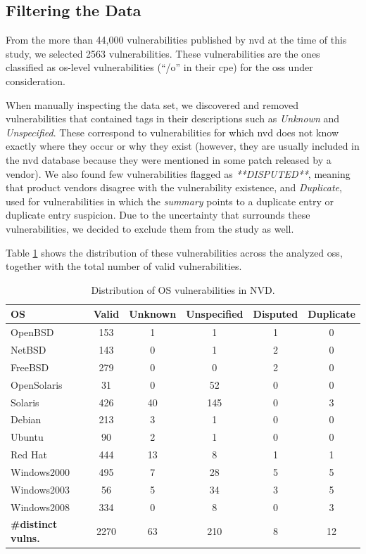 \subsection*{Filtering the Data}\label{filtering_data}


From the more than 44,000 vulnerabilities published by \gls{nvd} at the time of this study, we selected 2563 vulnerabilities.
These vulnerabilities are the ones classified as \gls{os}-level vulnerabilities (``/o'' in their \gls{cpe}) for the \glspl{os} under consideration.

When manually inspecting the data set, we discovered and removed vulnerabilities that contained tags in their descriptions such as \emph{Unknown} and \emph{Unspecified}. 
These correspond to vulnerabilities for which \gls{nvd} does not know exactly where they occur or why they exist (however, they are usually included in the \gls{nvd} database because they were mentioned in some patch released by a vendor). 
We also found few vulnerabilities flagged as \emph{**DISPUTED**}, meaning that product vendors disagree with the vulnerability existence, and \emph{Duplicate}, used for vulnerabilities in which the \emph{summary} points to a duplicate entry or duplicate entry suspicion.
Due to the uncertainty that surrounds these vulnerabilities, we decided to exclude them from the study as well.

Table \ref{tab:unknowns} shows the distribution of these vulnerabilities across the analyzed \glspl{os}, together with the total number of valid vulnerabilities.

\begin{table}[!ht]
\begin{center}
{\scriptsize
\begin{tabular}{|l||c | c | c | c | c|}\hline
\textbf{OS} & \textbf{Valid} & \textbf{Unknown} & \textbf{Unspecified} & \textbf{Disputed} & \textbf{Duplicate}  \\\hline\hline %
OpenBSD & 153 & 1 & 1 & 1 & 0 \\
NetBSD & 143 & 0 & 1 & 2 & 0  \\
FreeBSD & 279 & 0 & 0 & 2 & 0 \\
OpenSolaris & 31 & 0 & 52 & 0 & 0  \\
Solaris & 426 & 40 & 145 & 0 & 3  \\
Debian & 213 & 3 & 1 & 0 & 0  \\
Ubuntu & 90 & 2 & 1 & 0 & 0  \\
Red Hat & 444 & 13 & 8 & 1 & 1  \\
Windows2000 & 495 & 7 & 28 & 5 & 5  \\
Windows2003 & 56 & 5 & 34 & 3 & 5  \\
Windows2008 & 334 & 0 & 8 & 0 & 3   \\\hline\hline
\textbf{\#distinct vulns.} & 2270 & 63 & 210 & 8 & 12 \\ \hline
\end{tabular}
\caption{Distribution of OS vulnerabilities in NVD.}
\label{tab:unknowns}
}
\end{center}
\end{table}

